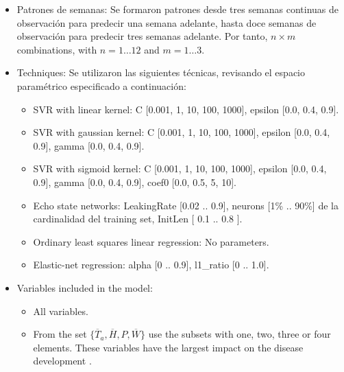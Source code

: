 \begin{itemize}
\item Patrones de semanas: Se formaron patrones desde tres semanas continuas
de observación para predecir una semana adelante, hasta doce semanas de
observación para predecir tres semanas adelante. Por tanto, $n\times{}m$ combinations, 
with $n=1\ldots{}12$ and $m=1\ldots{}3$.

\item Techniques: Se utilizaron las siguientes técnicas, revisando el espacio
paramétrico especificado a continuación:
\begin{itemize}
\item SVR with linear kernel: C [0.001, 1, 10, 100, 1000], epsilon [0.0, 0.4, 0.9].
\item SVR with gaussian kernel: C [0.001, 1, 10, 100, 1000], epsilon [0.0, 0.4, 0.9],
gamma [0.0, 0.4, 0.9].
\item SVR with sigmoid kernel: C [0.001, 1, 10, 100, 1000], epsilon [0.0, 0.4, 0.9],
gamma [0.0, 0.4, 0.9], coef0 [0.0, 0.5, 5, 10].
\item Echo state networks: LeakingRate [0.02 .. 0.9], neurons [1\% .. 90\%] de la 
cardinalidad del training set, InitLen [ 0.1 .. 0.8 ].
\item Ordinary least squares linear regression: No parameters.
\item Elastic-net regression: alpha [0 .. 0.9], l1_ratio [0 .. 1.0].
\end{itemize}

\item Variables included in the model:
\begin{itemize}
\item All variables.
\item From the set $\{ \overline{T}_{a} , \overline{H}, P ,
  \overline{W} \}$ use the subsets with one, two, three or four
  elements. These variables have the largest impact on the disease
  development \citep{MarinVargas1995}.
\end{itemize}
\end{itemize}

